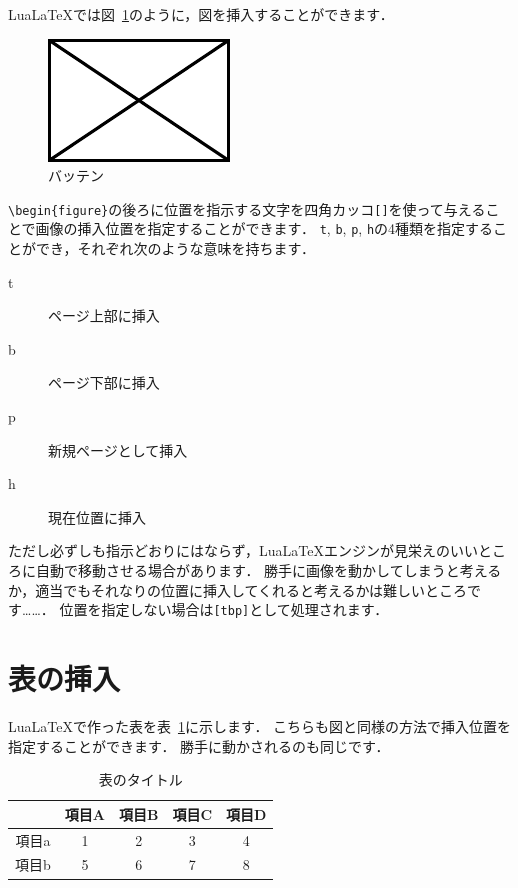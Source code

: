 \documentclass[10pt,a4j,twocolumn]{ltjsarticle}
\begin{document}
Lua\LaTeX では図~\ref{バッテンのラベル}のように，図を挿入することができます．
\begin{figure}[bp]
  \centering                                                  %
  \includegraphics[width=80truemm]{./sample_figure.pdf}       %
  \caption{バッテン}                                          %
  \label{バッテンのラベル}                                    %
\end{figure}
\verb|\begin{figure}|の後ろに位置を指示する文字を四角カッコ\verb|[]|を使って与えることで画像の挿入位置を指定することができます．
\verb|t|, \verb|b|, \verb|p|, \verb|h|の4種類を指定することができ，それぞれ次のような意味を持ちます．
\begin{description}
  \item[t] ページ上部に挿入
  \item[b] ページ下部に挿入
  \item[p] 新規ページとして挿入
  \item[h] 現在位置に挿入
\end{description}
ただし必ずしも指示どおりにはならず，Lua\LaTeX エンジンが見栄えのいいところに自動で移動させる場合があります．
勝手に画像を動かしてしまうと考えるか，適当でもそれなりの位置に挿入してくれると考えるかは難しいところです……．
位置を指定しない場合は\verb|[tbp]|として処理されます．

\section{表の挿入}

Lua\LaTeX で作った表を表~\ref{表のラベル}に示します．
こちらも図と同様の方法で挿入位置を指定することができます．
勝手に動かされるのも同じです．
\begin{table}
  \centering
  \caption{表のタイトル}
  \label{表のラベル}
  \begin{tabular}{c|cccc}
    \hline
          & 項目A & 項目B & 項目C & 項目D \\
    \hline \hline
    項目a & 1     & 2     & 3     & 4     \\
    項目b & 5     & 6     & 7     & 8     \\
    \hline
  \end{tabular}
\end{table}
\end{document}
